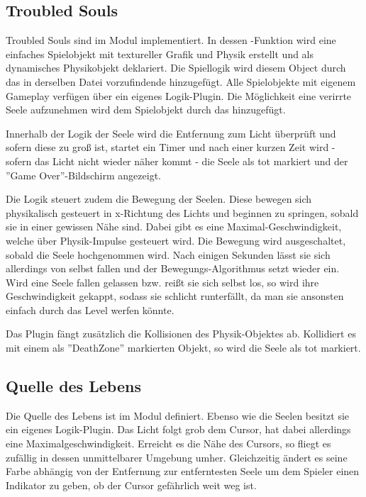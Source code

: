 \subsection{Troubled Souls}

Troubled Souls sind im Modul  implementiert. In dessen -Funktion wird eine einfaches Spielobjekt mit textureller Grafik und Physik erstellt und als dynamisches Physikobjekt deklariert. Die Spiellogik wird diesem Object durch das in derselben Datei vorzufindende  hinzugefügt. Alle Spielobjekte mit eigenem Gameplay verfügen über ein eigenes Logik-Plugin. Die Möglichkeit eine verirrte Seele aufzunehmen wird dem Spielobjekt durch das  hinzugefügt.

Innerhalb der Logik der Seele wird die Entfernung zum Licht überprüft und sofern diese zu groß ist, startet ein Timer und nach einer kurzen Zeit wird - sofern das Licht nicht wieder näher kommt -  die Seele als tot markiert und der ''Game Over''-Bildschirm angezeigt.

Die Logik steuert zudem die Bewegung der Seelen. Diese bewegen sich physikalisch gesteuert in x-Richtung des Lichts und beginnen zu springen, sobald sie in einer gewissen Nähe sind. Dabei gibt es eine Maximal-Geschwindigkeit, welche über Physik-Impulse gesteuert wird. Die Bewegung wird ausgeschaltet, sobald die Seele hochgenommen wird. Nach einigen Sekunden lässt sie sich allerdings von selbst fallen und der Bewegungs-Algorithmus setzt wieder ein. Wird eine Seele fallen gelassen bzw. reißt sie sich selbst los, so wird ihre Geschwindigkeit gekappt, sodass sie schlicht runterfällt, da man sie ansonsten einfach durch das Level werfen könnte.

Das Plugin fängt zusätzlich die Kollisionen des Physik-Objektes ab. Kollidiert es mit einem als ''DeathZone'' markierten Objekt, so wird die Seele als tot markiert.

\subsection{Quelle des Lebens}

Die Quelle des Lebens ist im Modul  definiert. Ebenso wie die Seelen besitzt sie ein eigenes Logik-Plugin. Das Licht folgt grob dem Cursor, hat dabei allerdings eine Maximalgeschwindigkeit. Erreicht es die Nähe des Cursors, so fliegt es zufällig in dessen unmittelbarer Umgebung umher. Gleichzeitig ändert es seine Farbe abhängig von der Entfernung zur entferntesten Seele um dem Spieler einen Indikator zu geben, ob der Cursor gefährlich weit weg ist.

